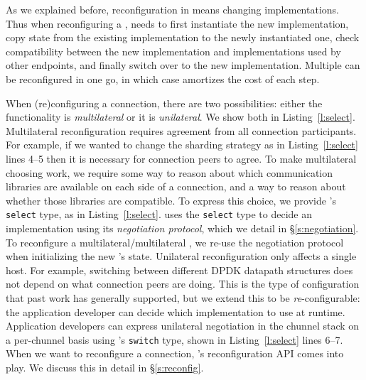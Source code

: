 \begin{outline}
  \1 As we explained before, reconfiguration in \name means changing \tunnel implementations.
    \2 Thus when reconfiguring a \tunnel, \name needs to first instantiate the new implementation, copy state from the existing \tunnel implementation to the newly instantiated one, check compatibility between the new implementation and implementations used by other endpoints, and finally switch over to the new implementation.    
    \2 Multiple \tunnels can be reconfigured in one go, in which case \name amortizes the cost of each step.
  
  \1 When (re)configuring a \name connection, there are two possibilities: either the functionality is \emph{multilateral} or it is \emph{unilateral}. We show both in Listing~\ref{l:select}.
    \2 Multilateral reconfiguration requires agreement from all connection participants. For example, if we wanted to change the sharding strategy as in Listing~\ref{l:select} lines 4--5 then it is necessary for connection peers to agree.
      \3 To make multilateral \tunnel choosing work, we require some way to reason about which communication libraries are available on each side of a connection, and a way to reason about whether those libraries are compatible.
      \3 To express this choice, we provide \name's \texttt{select} type, as in Listing~\ref{l:select}.
      \3 \name uses the \texttt{select} type to decide an implementation using its \emph{negotiation protocol}, which we detail in \S\ref{s:negotiation}.
      \3 To reconfigure a multilateral/multilateral \tunnel, we re-use the negotiation protocol when initializing the new \tunnel's state.
    \2 Unilateral reconfiguration only affects a single host. For example, switching between different DPDK datapath structures does not depend on what connection peers are doing. This is the type of configuration that past work has generally supported, but we extend this to be \emph{re}-configurable: the application developer can decide which implementation to use at runtime.
      \3 Application developers can express unilateral negotiation in the chunnel stack on a per-chunnel basis using \name's \texttt{switch} type, shown in Listing~\ref{l:select} lines 6--7.
      \3 When we want to reconfigure a connection, \name's reconfiguration API comes into play.
      \3 We discuss this in detail in \S\ref{s:reconfig}.
\end{outline}

